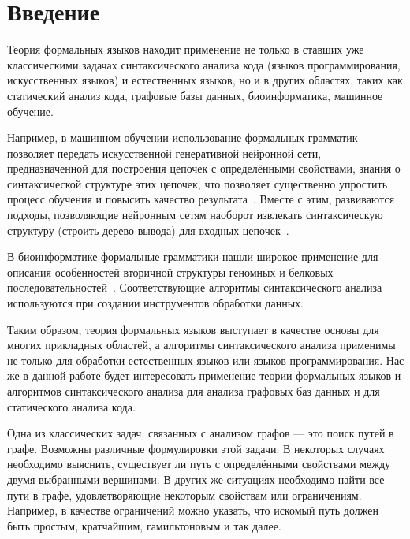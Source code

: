 \chapter*{Введение}

Теория формальных языков находит применение не только в ставших уже классическими задачах синтаксического анализа кода (языков программирования, искусственных языков) и естественных языков, но и в других областях, таких как статический анализ кода, графовые базы данных, биоинформатика, машинное обучение.

Например, в машинном обучении использование формальных грамматик позволяет передать искусственной генеративной нейронной сети, предназначенной для построения цепочек с определёнными свойствами, знания о синтаксической структуре этих цепочек, что позволяет существенно упростить процесс обучения и повысить качество результата~.
Вместе с этим, развиваются подходы, позволяющие нейронным сетям наоборот извлекать синтаксическую структуру (строить дерево вывода) для входных цепочек~.

В биоинформатике формальные грамматики нашли широкое применение для описания особенностей вторичной структуры геномных и белковых последовательностей~.
Соответствующие алгоритмы синтаксического анализа используются при создании инструментов обработки данных.

Таким образом, теория формальных языков выступает в качестве основы для многих прикладных областей, а алгоритмы синтаксического анализа применимы не только для обработки естественных языков или языков программирования.
Нас же в данной работе будет интересовать применение теории формальных языков и алгоритмов синтаксического анализа для анализа графовых баз данных и для статического анализа кода.

Одна из классических задач, связанных с анализом графов --- это поиск путей в графе.
Возможны различные формулировки этой задачи.
В некоторых случаях необходимо выяснить, существует ли путь с определёнными свойствами между двумя выбранными вершинами.
В других же ситуациях необходимо найти все пути в графе, удовлетворяющие некоторым свойствам или ограничениям.
Например, в качестве ограничений можно указать, что искомый путь должен быть простым, кратчайшим, гамильтоновым и так далее.

